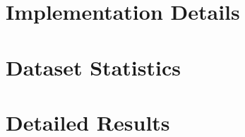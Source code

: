 \documentclass[letterpaper]{article} %
\begin{document}
\hfill

\appendix
\section{Implementation Details}\label{app:training_details}


\section{Dataset Statistics}\label{app:dataset_stats}


\section{Detailed Results}\label{app:detailed_results}

\end{document}
